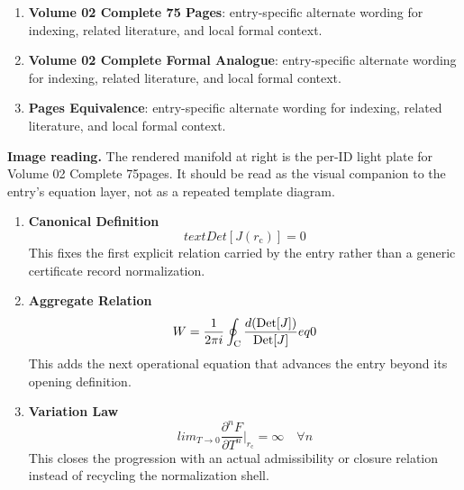 \begin{enumerate}[leftmargin=1.6em,itemsep=6pt,topsep=4pt]
\item \textbf{Volume 02 Complete 75 Pages}: entry-specific alternate wording for indexing, related literature, and local formal context.
\item \textbf{Volume 02 Complete Formal Analogue}: entry-specific alternate wording for indexing, related literature, and local formal context.
\item \textbf{Pages Equivalence}: entry-specific alternate wording for indexing, related literature, and local formal context.
\end{enumerate}

\begin{samepage}
\noindent\begin{minipage}[t]{0.45\linewidth}
\vspace{0pt}
\raggedright
\scriptsize\textbf{Image reading.} The rendered manifold at right is the per-ID light plate for Volume 02 Complete 75pages. It should be read as the visual companion to the entry's equation layer, not as a repeated template diagram.\par
\end{minipage}\hfill
\begin{minipage}[t]{0.53\linewidth}
\vspace*{-0.10in}
\raggedright
{}
\end{minipage}
\end{samepage}

\clearpage


\begin{enumerate}[leftmargin=1.6em,itemsep=9pt,topsep=6pt]
\item \textbf{Canonical Definition}
\[
text{Det}[J(r_{\mathrm{c}})] = 0
\]
This fixes the first explicit relation carried by the entry rather than a generic certificate record normalization.

\item \textbf{Aggregate Relation}
\[
W = \frac{1}{2\pi i} \oint_{\mathrm{C}} \frac{d(\text{Det}[J])}{{\rm Det}[J]}  eq 0
\]
This adds the next operational equation that advances the entry beyond its opening definition.

\item \textbf{Variation Law}
\[
lim_{T \to 0} \frac{\partial^n F}{\partial T^n}\bigg|_{r_{\mathrm{c}}} = \infty \quad \forall n
\]
This closes the progression with an actual admissibility or closure relation instead of recycling the normalization shell.
\end{enumerate}

